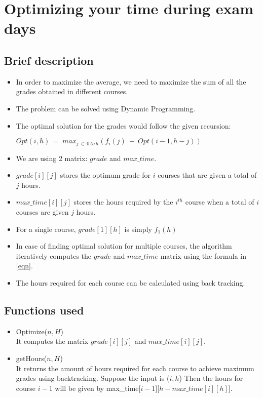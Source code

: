 \documentclass[pdftex,a4paper,12pt]{report}
\begin{document}
\section{Optimizing your time during exam days}
\subsection{Brief description}
\begin{itemize}
\item In order to maximize the average, we need to maximize the sum of all the grades obtained in different courses.\\
\item The problem can be solved using Dynamic Programming.\\
\item The optimal solution for the grades would follow the given recursion:
\begin{center}
\label{eqn}
$Opt(i,h)\ =\ max_{j\ \in\ 0\ to\ h}(f_{i}(j)\ +\ Opt(i-1,h-j))$
\end{center}
\item We are using 2 matrix: $grade$ and $max\_time$.
\item $grade[i][j]$ stores the optimum grade for $i$ courses that are given a total of $j$ hours.
\item $max\_time[i][j]$ stores the hours required by the $i^{th}$ course when a total of $i$ courses are given $j$ hours.
\item For a single course, $grade[1][h]$ is simply $f_1(h)$
\item In case of finding optimal solution for multiple courses, the algorithm iteratively computes the $grade$ and $max\_time$ matrix using the formula in \ref{eqn}.
\item The hours required for each course can be calculated using back tracking.
\end{itemize}
\subsection{Functions used}
\begin{itemize}
\item Optimize($n,H$)\\
It computes the matrix $grade[i][j]$ and $max\_time[i][j]$.
\item getHours($n,H$)\\
It returns the amount of hours required for each course to achieve maximum grades using backtracking. Suppose the input is ($i,h$) Then the hours for course $i-1$ will be given by max\_time[$i-1$][$h - max\_time[i][h]$].\\
\end{itemize}
\end{document}
